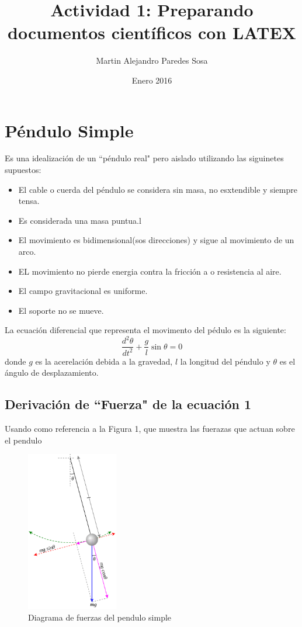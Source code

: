 \documentclass[12pt]{article}
\begin{document}
\title{Actividad 1: Preparando documentos científicos con LATEX}
\author{Martin Alejandro Paredes Sosa}
\date{Enero 2016}
\maketitle

\section{Péndulo Simple}
Es una idealización de un ``péndulo real" pero aislado utilizando las siguinetes supuestos:
\begin{itemize}
\item El cable o cuerda del péndulo se considera sin masa, no esxtendible y siempre tensa.
\item Es considerada una masa puntua.l %
\item El movimiento es bidimensional(sos direcciones) y sigue al movimiento de un arco.
\item EL movimiento no pierde energia contra la fricción a o resistencia al aire.
\item El campo gravitacional es uniforme.
\item El soporte no se mueve.
\end{itemize}

La ecuación diferencial que representa el movimento del pédulo es la siguiente:
\begin{equation}
\frac{d^2\theta}{dt^2}+\frac{g}{l}\sin\theta=0
\end{equation}
donde $g$ es la acerelación debida a la gravedad, $l$ la longitud del péndulo y $\theta$ es el ángulo de desplazamiento.

\subsection{Derivación de ``Fuerza" de la ecuación 1}
Usando como referencia a la Figura 1, que muestra las fuerazas que actuan sobre el pendulo
\begin{figure}[H]
\centering
\includegraphics[width=4cm]{pendulo}
\caption{Diagrama de fuerzas del pendulo simple}
\end{figure}
\end{document}
